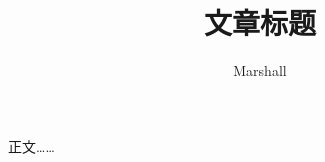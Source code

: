 \documentclass[11pt]{article}
\title{文章标题}
\author{Marshall}
\begin{document}
\maketitle

正文……
\end{document}
